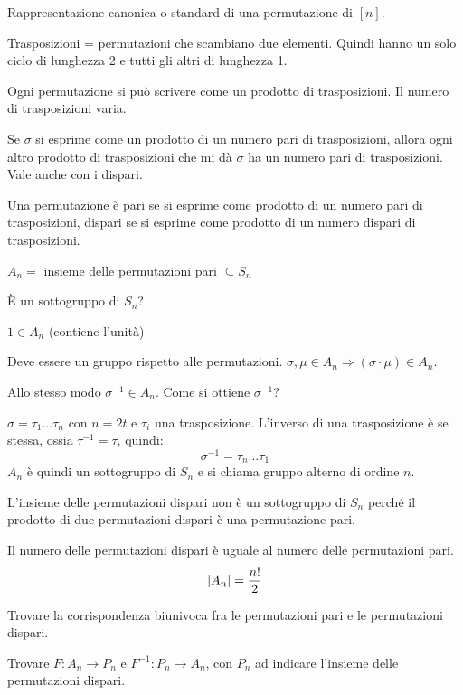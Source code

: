 Rappresentazione canonica o standard di una permutazione di $[n]$.

Trasposizioni = permutazioni che scambiano due elementi. Quindi hanno un solo ciclo di lunghezza 2 e tutti gli altri di lunghezza 1.

\begin{theorem}
Ogni permutazione si pu\`o scrivere come un prodotto di trasposizioni. Il numero di trasposizioni varia.
\end{theorem}

Se $\sigma$ si esprime come un prodotto di un numero pari di trasposizioni, allora ogni altro prodotto di trasposizioni che mi d\`a $\sigma$ ha un numero pari di trasposizioni. Vale anche con i dispari.

\begin{defn}
Una permutazione \`e pari se si esprime come prodotto di un numero pari di trasposizioni, dispari se si esprime come prodotto di un numero dispari di trasposizioni.
\end{defn}

$A_n =$ insieme delle permutazioni pari $\subseteq S_n$

\`E un sottogruppo di $S_n$?

$1 \in A_n$ (contiene l'unit\`a)

Deve essere un gruppo rispetto alle permutazioni. $\sigma, \mu \in A_n \Rightarrow (\sigma \cdot \mu) \in A_n$.

Allo stesso modo $\sigma^{-1} \in A_n$. Come si ottiene $\sigma^{-1}$?

$\sigma = \tau_{1} \dots \tau_{n}$ con $n = 2t$ e $\tau_i$ una trasposizione. L'inverso di una trasposizione \`e se stessa, ossia $\tau^{-1} = \tau$, quindi:
\[
\sigma^{-1} = \tau_n \dots \tau_1
\]
$A_n$ \`e quindi un sottogruppo di $S_n$ e si chiama gruppo alterno di ordine \label{gruppo_alterno} $n$.

L'insieme delle permutazioni dispari non \`e un sottogruppo di $S_n$ perch\'e il prodotto di due permutazioni dispari \`e una permutazione pari.

Il numero delle permutazioni dispari \`e uguale al numero delle permutazioni pari.
\[
\left\lvert{A_n}\right\rvert = \frac{n!}{2}
\]
\begin{esercizio}
Trovare la corrispondenza biunivoca fra le permutazioni pari e le permutazioni dispari.
\end{esercizio}

Trovare $F : A_n \to P_n$ e $F^{-1} : P_n \to A_n$, con $P_n$ ad indicare l'insieme delle permutazioni dispari.

